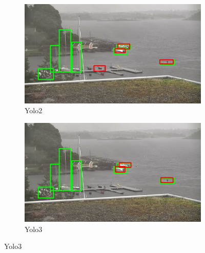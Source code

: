 \begin{figure}[h!]
\begin{subfigure}{.5\textwidth}
  \centering
  \includegraphics[width=0.9\linewidth]{results/case_buildings/yolo23/grove/yolo2/selected_08_09_frame8590.jpg}
  \caption{Yolo2}
\end{subfigure}%
\begin{subfigure}{.5\textwidth}
  \centering
  \includegraphics[width=.9\linewidth]{results/case_buildings/yolo23/grove/yolo3/selected_08_09_frame8590.jpg}
  \caption{Yolo3}
\end{subfigure}


\end{figure}

